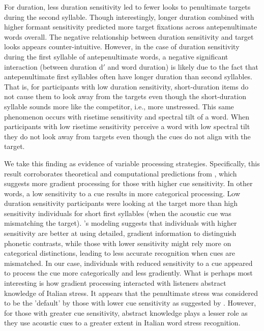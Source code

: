 For duration, less duration sensitivity led to fewer looks to penultimate targets during the second syllable. Though interestingly, longer duration combined with higher formant sensitivity predicted more target fixations across antepenultimate words overall. The negative relationship between duration sensitivity and target looks appears counter-intuitive. However, in the case of duration sensitivity during the first syllable of antepenultimate words, a negative significant interaction (between duration d$'$ and word duration) is likely due to the fact that antepenultimate first syllables often have longer duration than second syllables. That is, for participants with low duration sensitivity, short-duration items do not cause them to look away from the targets even though the short-duration syllable sounds more like the competitor, i.e., more unstressed. This same phenomenon occurs with risetime sensitivity and spectral tilt of a word. When participants with low risetime sensitivity perceive a word with low spectral tilt they do not look away from targets even though the cues do not align with the target. 

We take this finding as evidence of variable processing strategies. Specifically, this result corroborates theoretical and computational predictions from \cite{mcmurray_2009}, which suggests more gradient processing for those with higher cue sensitivity. In other words, a low sensitivity to a cue results in more categorical processing. Low duration sensitivity participants were looking at the target more than high sensitivity individuals for short first syllables (when the acoustic cue was mismatching the target). \cite{mcmurray_2009}'s modeling suggests that individuals with higher sensitivity are better at using detailed, gradient information to distinguish phonetic contrasts, while those with lower sensitivity might rely more on categorical distinctions, leading to less accurate recognition when cues are mismatched. In our case, individuals with reduced sensitivity to a cue appeared to process the cue more categorically and less gradiently. What is perhaps most interesting is how gradient processing interacted with listeners abstract knowledge of Italian stress. It appears that the penultimate stress was considered to be the 'default' by those with lower cue sensitivity  as suggested by \cite{Sulpizio_McQueen_2012}. However, for those with greater cue sensitivity, abstract knowledge plays a lesser role as they use acoustic cues to a greater extent in Italian word stress recognition. 

